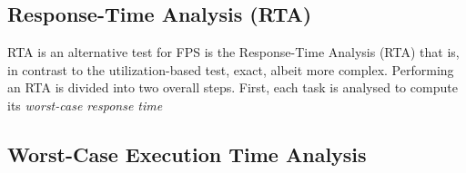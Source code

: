
\subsection{Response-Time Analysis (RTA)} %
\label{sub:response_time_analysis_}
RTA is an alternative test for FPS is the Response-Time Analysis (RTA) that is, in contrast to the utilization-based test, exact, albeit more complex. Performing an RTA is divided into two overall steps. First, each task is analysed to compute its \textit{worst-case response time}



\subsection{Worst-Case Execution Time Analysis} %
\label{sub:worst_case_execution_time_analysis}



